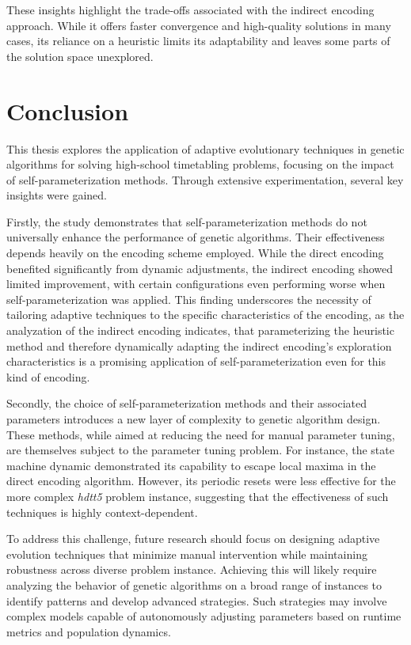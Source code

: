 \documentclass[english,examples]{isasthesis}
\begin{document}
These insights highlight the trade-offs associated with the indirect encoding
approach. While it offers faster convergence and high-quality solutions in many
cases, its reliance on a heuristic limits its adaptability and leaves some
parts of the solution space unexplored.


\chapter{Conclusion}
This thesis explores the application of adaptive evolutionary techniques in
genetic algorithms for solving high-school timetabling problems, focusing on
the impact of self-parameterization methods. Through extensive experimentation,
several key insights were gained.

Firstly, the study demonstrates that self-parameterization methods do not
universally enhance the performance of genetic algorithms. Their effectiveness
depends heavily on the encoding scheme employed. While the direct encoding
benefited significantly from dynamic adjustments, the indirect encoding showed
limited improvement, with certain configurations even performing worse when
self-parameterization was applied. This finding underscores the necessity
of tailoring adaptive techniques to the specific characteristics of the
encoding, as the analyzation of the indirect encoding indicates, that
parameterizing the heuristic method and therefore dynamically adapting the
indirect encoding's exploration characteristics is a promising application
of self-parameterization even for this kind of encoding.

Secondly, the choice of self-parameterization methods and their associated
parameters introduces a new layer of complexity to genetic algorithm design.
These methods, while aimed at reducing the need for manual parameter tuning,
are themselves subject to the parameter tuning problem. For instance, the
state machine dynamic demonstrated its capability to escape local maxima in the
direct encoding algorithm. However, its periodic resets were less effective
for the more complex \textit{hdtt5} problem instance, suggesting that the
effectiveness of such techniques is highly context-dependent.

To address this challenge, future research should focus on designing adaptive
evolution techniques that minimize manual intervention while maintaining
robustness across diverse problem instance. Achieving this will likely require
analyzing the behavior of genetic algorithms on a broad range of instances to
identify patterns and develop advanced strategies. Such strategies may involve
complex models capable of autonomously adjusting parameters based on runtime
metrics and population dynamics.
\end{document}
